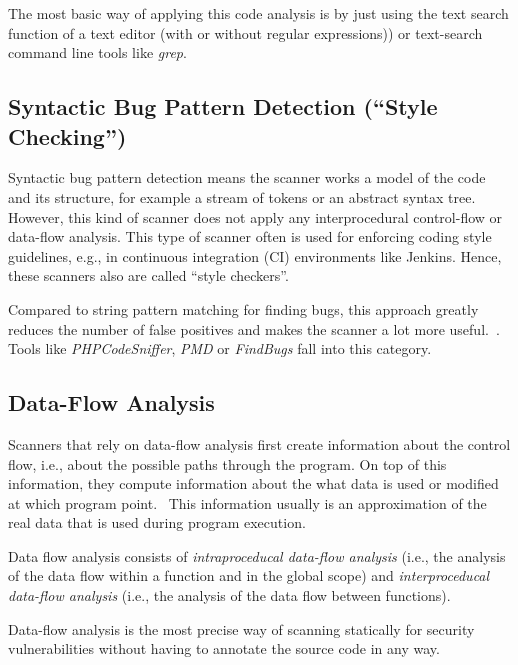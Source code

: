 The most basic way of applying this code analysis is by just using the text search function of a text editor (with or without regular expressions)) or text-search command line tools like \emph{grep}.


\subsection{Syntactic Bug Pattern Detection (``Style Checking'')}

Syntactic bug pattern detection means the scanner works a model of the code and its structure, for example a stream of tokens or an abstract syntax tree. However, this kind of scanner does not apply any interprocedural control-flow or data-flow analysis. This type of scanner often is used for enforcing coding style guidelines, e.g., in continuous integration (CI) environments like Jenkins. Hence, these scanners also are called ``style checkers''.

Compared to string pattern matching for finding bugs, this approach greatly reduces the number of false positives and makes the scanner a lot more useful.~\cite{comparison-of-bug-finding-tools}. Tools like \emph{PHPCodeSniffer}, \emph{PMD} or \emph{FindBugs} fall into this category.


\subsection{Data-Flow Analysis}

Scanners that rely on data-flow analysis first create information about the control flow, i.e., about the possible paths through the program. On top of this information, they compute information about the what data is used or modified at which program point.~\cite{data-flow-analysis} This information usually is an approximation of the real data that is used during program execution.

Data flow analysis consists of \emph{intraproceducal data-flow analysis} (i.e., the analysis of the data flow within a function and in the global scope) and \emph{interproceducal data-flow analysis} (i.e., the analysis of the data flow between functions).

Data-flow analysis is the most precise way of scanning statically for security vulnerabilities without having to annotate the source code in any way.

